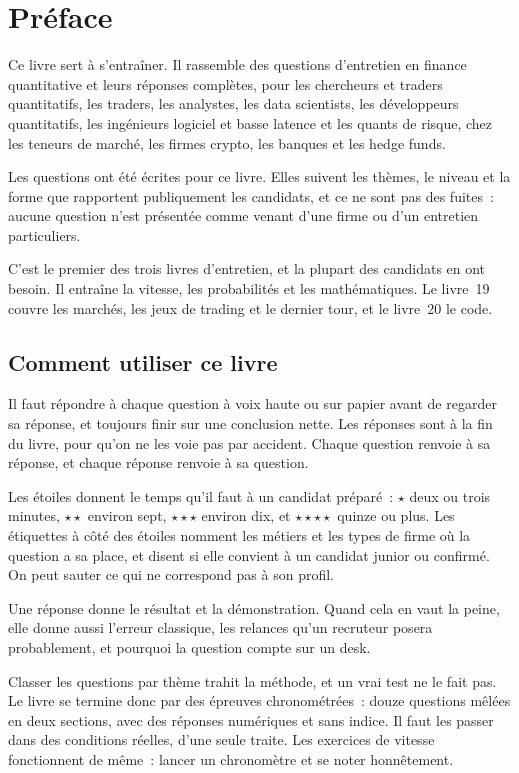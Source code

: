 \chapter{Préface}

Ce livre sert à s'entraîner. Il rassemble des questions d'entretien en finance quantitative et leurs réponses
complètes, pour les chercheurs et traders quantitatifs, les traders, les analystes, les data scientists, les
développeurs quantitatifs, les ingénieurs logiciel et basse latence et les quants de risque, chez les teneurs de
marché, les firmes crypto, les banques et les hedge funds.

Les questions ont été écrites pour ce livre. Elles suivent les thèmes, le niveau et la forme que rapportent
publiquement les candidats, et ce ne sont pas des fuites~: aucune question n'est présentée comme venant d'une firme ou
d'un entretien particuliers.

C'est le premier des trois livres d'entretien, et la plupart des candidats en ont besoin. Il entraîne la vitesse,
les probabilités et les mathématiques. Le livre~19 couvre les marchés, les jeux de trading et le dernier tour, et le
livre~20 le code.

\section*{Comment utiliser ce livre}

Il faut répondre à chaque question à voix haute ou sur papier avant de regarder sa réponse, et toujours finir sur une
conclusion nette. Les réponses sont à la fin du livre, pour qu'on ne les voie pas par accident. Chaque question renvoie
à sa réponse, et chaque réponse renvoie à sa question.

Les étoiles donnent le temps qu'il faut à un candidat préparé~: $\star$ deux ou trois minutes, $\star\star$ environ
sept, $\star\star\star$ environ dix, et $\star\star\star\star$ quinze ou plus. Les étiquettes à côté des étoiles
nomment les métiers et les types de firme où la question a sa place, et disent si elle convient à un candidat junior
ou confirmé. On peut sauter ce qui ne correspond pas à son profil.

Une réponse donne le résultat et la démonstration. Quand cela en vaut la peine, elle donne aussi l'erreur classique,
les relances qu'un recruteur posera probablement, et pourquoi la question compte sur un desk.

Classer les questions par thème trahit la méthode, et un vrai test ne le fait pas. Le livre se termine donc par des
épreuves chronométrées~: douze questions mêlées en deux sections, avec des réponses numériques et sans indice. Il faut
les passer dans des conditions réelles, d'une seule traite. Les exercices de vitesse fonctionnent de même~: lancer un
chronomètre et se noter honnêtement.

